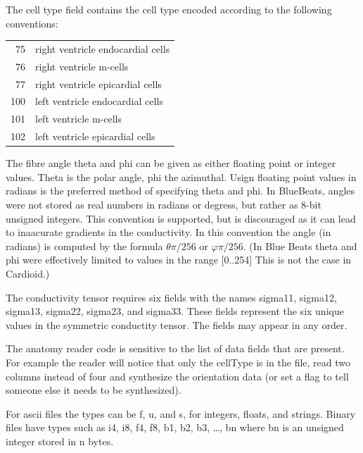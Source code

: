 \documentclass{article}
\begin{document}
The cell type field contains the cell type encoded according to the
following conventions:
\begin{center}
  \begin{tabular}{rl}
    75 & right ventricle endocardial cells\\
    76 & right ventricle m-cells\\
    77 & right ventricle epicardial cells\\
    100 & left ventricle endocardial cells\\
    101 & left ventricle m-cells\\
    102 & left ventricle epicardial cells\\
  \end{tabular}
\end{center}

The fibre angle theta and phi can be given as either floating point or
integer values.  Theta is the polar angle, phi the azimuthal.  Usign
floating point values in radians is the preferred method of specifying
theta and phi.  In BlueBeats, angles were not stored as real numbers in
radians or degress, but rather as 8-bit unsigned integers.  This
convention is supported, but is discouraged as it can lead to inaacurate
gradients in the conductivity.  In this convention the angle (in
radians) is computed by the formula $\theta\pi/256$ or $\varphi\pi/256$.
(In Blue Beats theta and phi were effectively limited to values in the
range [0..254] This is not the case in Cardioid.)


The conductivity tensor requires six
fields with the names sigma11, sigma12, sigma13, sigma22, sigma23, and
sigma33.  These fields represent the six unique values in the symmetric
conductity tensor.  The fields may appear in any order.


The anatomy reader code is sensitive to the list of data fields
that are present.  For example the reader will notice that only the
cellType is in the file, read two columns instead of four and synthesize
the orientation data (or set a flag to tell someone else it needs to be
synthesized).

For ascii files the types can be f, u, and s, for integers, floats, and
strings.  Binary files have types such as i4, i8, f4, f8, b1, b2, b3, \ldots,
bn where bn is an unsigned integer stored in n bytes.
\end{document}
